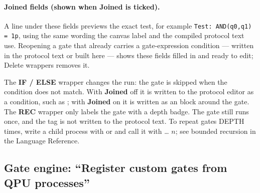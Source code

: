 \paragraph{Joined fields (shown when Joined is ticked).}
A line under these fields previews the exact test, for example
\texttt{Test: AND(q0,q1) = 1p}, using the same wording the canvas label and
the compiled protocol text use. Reopening a gate that already carries a
gate-expression condition --- written in the protocol text or built here ---
shows these fields filled in and ready to edit; Delete wrappers removes it.

\begin{cautionbox}
The \textbf{IF / ELSE} wrapper changes the run: the gate is skipped when the
condition does not match. With \textbf{Joined} off it is written to the
protocol editor as a  condition, such as
; with \textbf{Joined} on it is written as
an  block around the gate. The
\textbf{REC} wrapper only labels the gate with a depth badge. The gate still
runs once, and the tag is not written to the protocol text. To repeat gates
DEPTH times, write a child process with  or  and call
it with  \ldots{}  $n$; see bounded recursion in
the Language Reference.
\end{cautionbox}

\subsection{Gate engine: ``Register custom gates from QPU processes''}
\hypertarget{ui-custom-gates}{}

